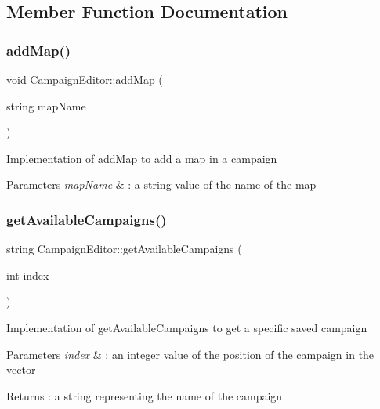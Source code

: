 \subsection{Member Function Documentation}
\hypertarget{class_campaign_editor_af034142dc6af33969dd15788881ef238}{}\label{class_campaign_editor_af034142dc6af33969dd15788881ef238} 
\subsubsection{\texorpdfstring{add\+Map()}{addMap()}}
{\footnotesize\ttfamily void Campaign\+Editor\+::add\+Map (\begin{DoxyParamCaption}\item[{string}]{map\+Name }\end{DoxyParamCaption})}

Implementation of add\+Map to add a map in a campaign 
\begin{DoxyParams}{Parameters}
{\em map\+Name} & \+: a string value of the name of the map \\
\hline
\end{DoxyParams}
\hypertarget{class_campaign_editor_aab2f6f1c0ae07f3ba60c6c23a85e77de}{}\label{class_campaign_editor_aab2f6f1c0ae07f3ba60c6c23a85e77de} 
\subsubsection{\texorpdfstring{get\+Available\+Campaigns()}{getAvailableCampaigns()}}
{\footnotesize\ttfamily string Campaign\+Editor\+::get\+Available\+Campaigns (\begin{DoxyParamCaption}\item[{int}]{index }\end{DoxyParamCaption})}

Implementation of get\+Available\+Campaigns to get a specific saved campaign 
\begin{DoxyParams}{Parameters}
{\em index} & \+: an integer value of the position of the campaign in the vector \\
\hline
\end{DoxyParams}
\begin{DoxyReturn}{Returns}
\+: a string representing the name of the campaign 
\end{DoxyReturn}
\hypertarget{class_campaign_editor_a08c98dcccedb2d109a3eca6ca47f7749}{}\label{class_campaign_editor_a08c98dcccedb2d109a3eca6ca47f7749} 

